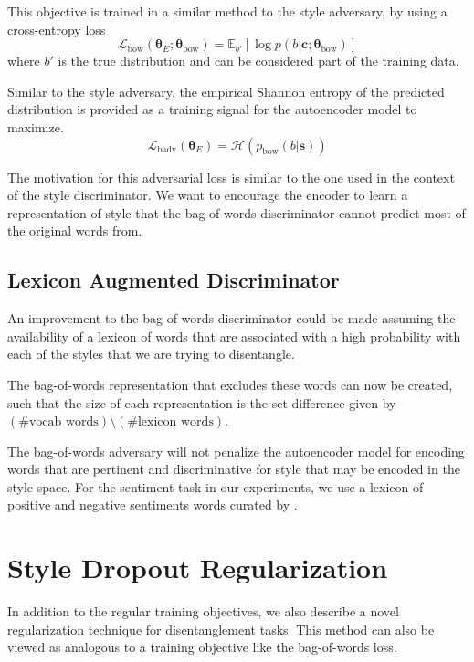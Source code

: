 This objective is trained in a similar method to the style adversary, by using a cross-entropy loss
\begin{equation} \label{eqn:adv-bow-disc-loss}
	\mathcal{L}_\text{bow}(\bm\theta_{E};\bm\theta_\text{bow}) =
	\mathbb{E}_{b'} [\log p(b | \bm c; \bm\theta_\text{bow})]
\end{equation}
where $b'$ is the true distribution and can be considered part of the training data.

Similar to the style adversary, the empirical Shannon entropy of the predicted distribution is provided as a training signal for the autoencoder model to maximize.
\begin{equation}
	\mathcal{L}_\text{badv}(\bm\theta_E) = \mathcal{H}(p_\text{bow}(b | \bm s))
\end{equation}

The motivation for this adversarial loss is similar to the one used in the context of the style discriminator. We want to encourage the encoder to learn a representation of style that the bag-of-words discriminator cannot predict most of the original words from.

\subsection{Lexicon Augmented Discriminator}

An improvement to the bag-of-words discriminator could be made assuming the availability of a lexicon of words that are associated with a high probability with each of the styles that we are trying to disentangle.

The bag-of-words representation that excludes these words can now be created, such that the size of each representation is the set difference given by $(\text{\# vocab words}) \setminus (\text{\# lexicon words})$.

The bag-of-words adversary will not penalize the autoencoder model for encoding words that are pertinent and discriminative for style that may be encoded in the style space. For the sentiment task in our experiments, we use a lexicon of positive and negative sentiments words curated by \cite{hu2004mining}.


\section{Style Dropout Regularization} \label{ssec:style-dropout}

In addition to the regular training objectives, we also describe a novel regularization technique for disentanglement tasks. This method can also be viewed as analogous to a training objective like the bag-of-words loss.

